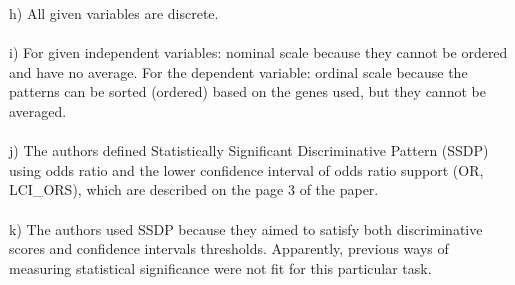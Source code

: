 \documentclass[a4paper,12pt]{article}
\newcommand{\<}{\langle}
\renewcommand{\>}{\rangle}
\newcommand{\1}{\mathbbm{1}}
\begin{document}
h) All given variables are discrete. \\\\
i) For given independent variables: nominal scale because they cannot be ordered and have no average. For the dependent variable: ordinal scale because the patterns can be sorted (ordered) based on the genes used, but they cannot be averaged. \\\\
j) The authors defined Statistically Significant Discriminative Pattern (SSDP) using odds ratio and the lower confidence interval of odds ratio support (OR, LCI\_ORS), which are described on the page 3 of the paper. \\\\
k) The authors used SSDP because they aimed to satisfy both discriminative scores and confidence intervals thresholds. Apparently, previous ways of measuring statistical significance were not fit for this particular task.
\end{document}
